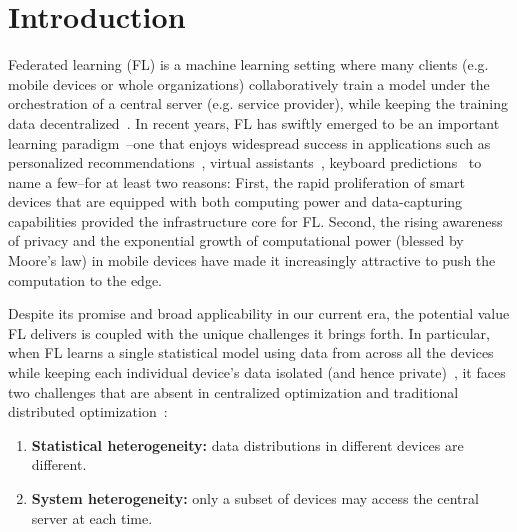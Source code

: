

\section{Introduction}
Federated learning (FL) is a machine learning setting where many clients (e.g. mobile devices or whole organizations) collaboratively train a model under the orchestration of a central server (e.g. service provider), while keeping the training data decentralized~\cite{kairouz2019advances}.
In recent years, FL has swiftly emerged to be an important learning paradigm~\cite{mcmahan2016communication}--one that enjoys widespread success in applications such as personalized recommendations~\cite{chen2018federated}, virtual assistants~\cite{lamautonomy}, keyboard predictions~\cite{47586} to name a few--for at least two reasons: First, the rapid proliferation of smart devices that are equipped with both computing power and data-capturing capabilities provided the infrastructure core for FL. Second, the rising awareness of privacy and the exponential growth of computational power (blessed by Moore's law) in mobile devices have made it increasingly attractive to push the computation to the edge.

Despite its promise and broad applicability in our current era, the potential value FL delivers is coupled with the unique challenges it brings forth. In particular,
when FL learns a single statistical model using data from across all the devices while keeping each individual device's data isolated (and hence private)~\cite{kairouz2019advances}, it faces two challenges that are absent in centralized optimization and traditional distributed optimization~\cite{li2019convergence,smith2017federated}:
\begin{enumerate}
\item\textbf{Statistical heterogeneity:} data distributions in different devices are different.
\item\textbf{System heterogeneity:} only a subset of devices may access the central server at each time. 
\end{enumerate}

